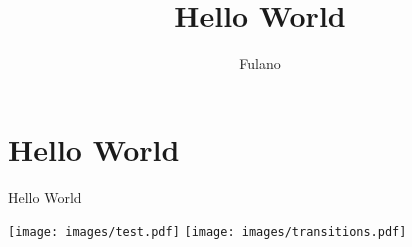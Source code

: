 \documentclass[A4paper, 12pt]{article}
\title{Hello World}
\author{Fulano}
\begin{document}
\nocite{*}
\tableofcontents
\maketitle

\cite{asyatoms}

\section{Hello World} %
\label{sec:hello_world}







Hello World


\texttt{[image: images/test.pdf]}
\newpage
\texttt{[image: images/transitions.pdf]}



\end{document}
